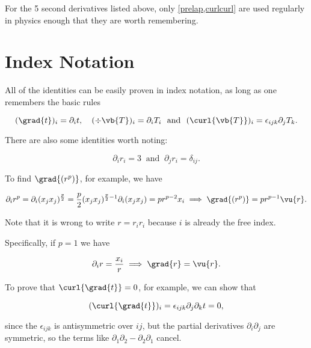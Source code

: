 \documentclass[english,a4paper,12pt]{report}
\begin{document}
For the 5 second derivatives listed above, only \cref{prelap,curlcurl} are used regularly in physics enough that they are worth remembering. 

\section{Index Notation}

All of the identities can be easily proven in index notation, as long as one remembers the basic rules 

\begin{equation}
	(\grad{t} )_{i} = \partial _{i}t, \quad (\div{\vb{T} } )_{i} = \partial _{i}T_{i} ~\text { and }~ (\curl{\vb{T} } )_{i} = \epsilon _{ijk}\partial _{j}T_{k}.          
\end{equation}

There are also some identities worth noting:

\begin{equation}
	\partial _{i} r_{i}  = 3 ~\text { and }~ \partial _{j}r_{i} = \delta _{ij}. 
\end{equation}

To find \(\grad{(r^{p}) } \), for example, we have 

\begin{equation}
	\partial _{i}r^{p} = \partial _{i}(x_{j}x_{j}  )^{\frac{p}{2} } = \frac{p}{2}(x_{j}x_{j})^{\frac{p}{2}-1 } \partial _{i}(x_{j}x_{j}  ) = pr^{p-2}x_{i} \implies \grad{(r^{p} ) } = pr^{p-1}\vu{r} .           
\end{equation}

Note that it is wrong to write \(r = r_{i}r_{i}  \) because \(i\) is already the free index.

Specifically, if \(p = 1\) we have 

\begin{equation}
	\partial _{i}r = \frac{x_{i} }{r} \implies \grad{r} = \vu{r} .   
\end{equation}

To prove that \(\curl{\grad{t} } = 0\), for example, we can show that 

\begin{equation}
	(\curl{\grad{t} })_{i}  = \epsilon _{ijk} \partial _{j}\partial _{k}t = 0,  
\end{equation}

since the \(\epsilon _{ijk} \) is antisymmetric over \(ij\), but the partial derivatives \(\partial _{i}\partial _{j}  \) are symmetric, so the terms like \(\partial _{1}\partial _{2} - \partial _{2}\partial _{1}    \)  cancel.   
\end{document}
